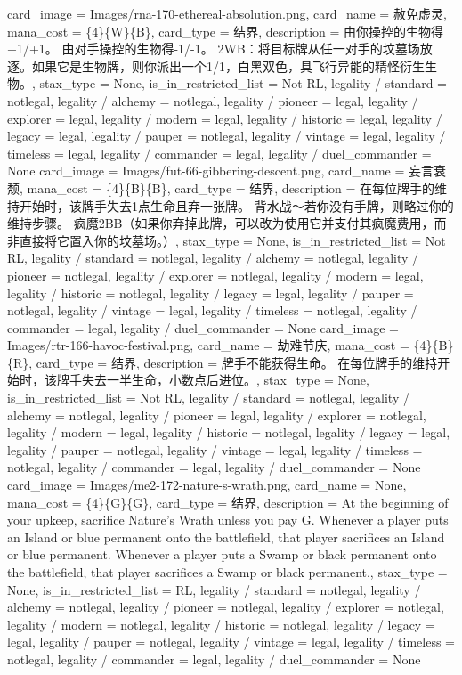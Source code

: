 \documentclass[lang = cn, color = black, 10pt]{AllThatStax}
\begin{document}
\card
{
	card_image = Images/rna-170-ethereal-absolution.png,
	card_name = 赦免虚灵,
	mana_cost = \{4\}\{W\}\{B\},
	card_type = 结界,
	description = 由你操控的生物得+1/+1。
	由对手操控的生物得-1/-1。
	{2}{W}{B}：将目标牌从任一对手的坟墓场放逐。如果它是生物牌，则你派出一个1/1，白黑双色，具飞行异能的精怪衍生生物。,
	stax_type = None,
	is_in_restricted_list = Not RL,
	legality / standard = notlegal,
	legality / alchemy = notlegal,
	legality / pioneer = legal,
	legality / explorer = legal,
	legality / modern = legal,
	legality / historic = legal,
	legality / legacy = legal,
	legality / pauper = notlegal,
	legality / vintage = legal,
	legality / timeless = legal,
	legality / commander = legal,
	legality / duel_commander = None
}
\card
{
	card_image = Images/fut-66-gibbering-descent.png,
	card_name = 妄言衰颓,
	mana_cost = \{4\}\{B\}\{B\},
	card_type = 结界,
	description = 在每位牌手的维持开始时，该牌手失去1点生命且弃一张牌。
	背水战～若你没有手牌，则略过你的维持步骤。
	疯魔{2}{B}{B}（如果你弃掉此牌，可以改为使用它并支付其疯魔费用，而非直接将它置入你的坟墓场。）,
	stax_type = None,
	is_in_restricted_list = Not RL,
	legality / standard = notlegal,
	legality / alchemy = notlegal,
	legality / pioneer = notlegal,
	legality / explorer = notlegal,
	legality / modern = legal,
	legality / historic = notlegal,
	legality / legacy = legal,
	legality / pauper = notlegal,
	legality / vintage = legal,
	legality / timeless = notlegal,
	legality / commander = legal,
	legality / duel_commander = None
}
\card
{
	card_image = Images/rtr-166-havoc-festival.png,
	card_name = 劫难节庆,
	mana_cost = \{4\}\{B\}\{R\},
	card_type = 结界,
	description = 牌手不能获得生命。
	在每位牌手的维持开始时，该牌手失去一半生命，小数点后进位。,
	stax_type = None,
	is_in_restricted_list = Not RL,
	legality / standard = notlegal,
	legality / alchemy = notlegal,
	legality / pioneer = legal,
	legality / explorer = notlegal,
	legality / modern = legal,
	legality / historic = notlegal,
	legality / legacy = legal,
	legality / pauper = notlegal,
	legality / vintage = legal,
	legality / timeless = notlegal,
	legality / commander = legal,
	legality / duel_commander = None
}
\card
{
	card_image = Images/me2-172-nature-s-wrath.png,
	card_name = None,
	mana_cost = \{4\}\{G\}\{G\},
	card_type = 结界,
	description = At the beginning of your upkeep, sacrifice Nature's Wrath unless you pay {G}.
	Whenever a player puts an Island or blue permanent onto the battlefield, that player sacrifices an Island or blue permanent.
	Whenever a player puts a Swamp or black permanent onto the battlefield, that player sacrifices a Swamp or black permanent.,
	stax_type = None,
	is_in_restricted_list = RL,
	legality / standard = notlegal,
	legality / alchemy = notlegal,
	legality / pioneer = notlegal,
	legality / explorer = notlegal,
	legality / modern = notlegal,
	legality / historic = notlegal,
	legality / legacy = legal,
	legality / pauper = notlegal,
	legality / vintage = legal,
	legality / timeless = notlegal,
	legality / commander = legal,
	legality / duel_commander = None
}
\end{document}
